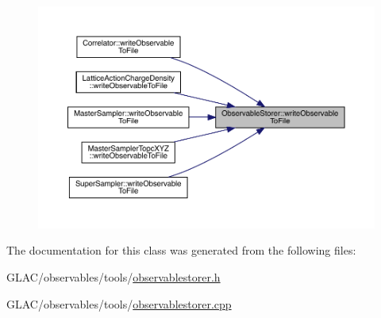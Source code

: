\begin{figure}[H]
\begin{center}
\leavevmode
\includegraphics[width=350pt]{class_observable_storer_a146f9acb8a0a2ce15782d26bdc4f0bf9_icgraph}
\end{center}
\end{figure}


The documentation for this class was generated from the following files\+:\begin{DoxyCompactItemize}
\item 
G\+L\+A\+C/observables/tools/\mbox{\hyperlink{observablestorer_8h}{observablestorer.\+h}}\item 
G\+L\+A\+C/observables/tools/\mbox{\hyperlink{observablestorer_8cpp}{observablestorer.\+cpp}}\end{DoxyCompactItemize}
